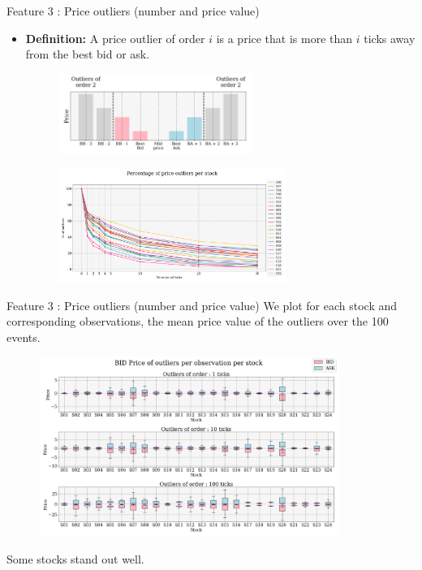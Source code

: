 \documentclass{beamer}
\begin{document}
\begin{frame}{Feature 3 : Price outliers (number and price value)}
    \begin{itemize}
        \item \textbf{Definition:} A price outlier of order $i$ is a price that is more than $i$ ticks away from the best bid or ask.
              \begin{figure}[H]
                  \centering
                  \includegraphics[width=0.6\textwidth]{figures/price_outliers_def.png}
              \end{figure}
              \begin{figure}[H]
                  \centering
                  \includegraphics[width=0.7\textwidth]{figures/percentage_outliers_per_stock.png}
              \end{figure}
    \end{itemize}
\end{frame}

\begin{frame}{Feature 3 : Price outliers (number and price value)}
    We plot for each stock and corresponding observations, the mean price value of the outliers over the 100 events.
    \begin{figure}[H]
        \centering
        \includegraphics[width=0.87\textwidth]{figures/boxplot_price_outliers_BID_ASK.png}
    \end{figure}
    Some stocks stand out well.
\end{frame}
\end{document}
